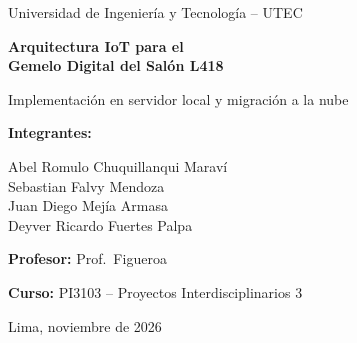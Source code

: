 \documentclass[11pt,a4paper]{article}
\begin{document}
\begin{titlepage}
  \centering
  {\large Universidad de Ingenier\'ia y Tecnolog\'ia -- UTEC\par}
  \vspace{2.5cm}
  {\Huge\bfseries Arquitectura IoT para el\\[4pt] Gemelo Digital del Sal\'on L418\par}
  \vspace{0.8cm}
  {\Large Implementaci\'on en servidor local y migraci\'on a la nube\par}
  \vspace{2.5cm}
  {\large \textbf{Integrantes:}\par}
  \vspace{0.2cm}
  {\large Abel Romulo Chuquillanqui Marav\'i\\ Sebastian Falvy Mendoza\\ Juan Diego Mej\'ia Armasa\\ Deyver Ricardo Fuertes Palpa\par}
  \vspace{0.6cm}
  {\large \textbf{Profesor:} Prof.\ Figueroa\par}
  \vspace{0.3cm}
  {\large \textbf{Curso:} PI3103 -- Proyectos Interdisciplinarios 3\par}
  \vfill
  {\large Lima, noviembre de 2026\par}
\end{titlepage}

\begin{abstract}
Este informe documenta, paso a paso, la implementaci\'on de una arquitectura de
Internet de las Cosas (IoT) que alimenta el gemelo digital del sal\'on L418. Siete nodos
basados en ESP32 miden la concentraci\'on de CO$_2$ (MH-Z1911A), el nivel sonoro (INMP441),
gases combustibles y humo (MQ-2), la iluminaci\'on (BH1750), la ocupaci\'on mediante una
c\'amara t\'ermica (MLX90640), el estado de la puerta (KY-024) y la temperatura, humedad y
presi\'on (BME280). Cada nodo procesa sus mediciones localmente, detecta anomal\'ias y
transmite por ESP-NOW a un ESP32 central (gateway), que publica los datos por MQTT hacia un
servidor con Mosquitto, Telegraf, InfluxDB y Grafana. Los datos se visualizan en tiempo real,
se exportan a CSV para cualquier rango de tiempo y alimentan el gemelo digital 2D del
sal\'on. El sistema se valid\'o de punta a punta con un servidor local, cada nodo se verific\'o
en simulaci\'on, y se prepar\'o la versi\'on de producci\'on para la nube, con HTTPS, MQTT cifrado
y acceso p\'ublico de solo lectura. Los archivos citados se encuentran en el repositorio
indicado en los anexos.
\end{abstract}
\end{document}
